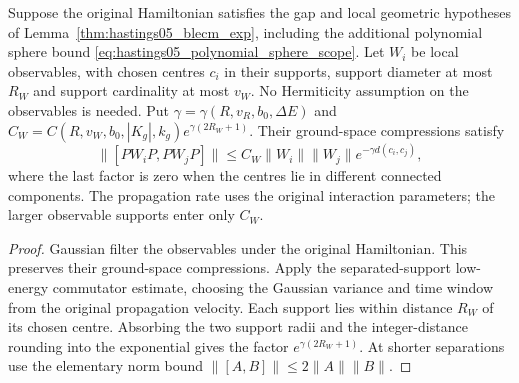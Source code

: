 \begin{lemma}
    \label{thm:hastings05_observable_commutator_decay}
    \leanok
    Suppose the original Hamiltonian satisfies the gap and local geometric
    hypotheses of Lemma~\ref{thm:hastings05_blecm_exp}, including the
    additional polynomial sphere bound
    \eqref{eq:hastings05_polynomial_sphere_scope}. Let $W_i$ be local
    observables, with chosen centres $c_i$ in their supports, support diameter
    at most $R_W$ and support cardinality at most $v_W$. No Hermiticity
    assumption on the observables is needed. Put
    $\gamma=\gamma(R,v_R,b_0,\Delta E)$ and
    $C_W=C(R,v_W,b_0,|K_g|,k_g)e^{\gamma(2R_W+1)}$.
    Their ground-space compressions satisfy
    \[
        \|[PW_iP,PW_jP]\|
        \le C_W\|W_i\|\|W_j\|e^{-\gamma d(c_i,c_j)},
    \]
    where the last factor is zero when the centres lie in different
    connected components. The propagation rate uses the original interaction
    parameters; the larger observable supports enter only $C_W$.
\end{lemma}
\begin{proof}\leanok
    Gaussian filter the observables under the original Hamiltonian. This
    preserves their ground-space compressions. Apply the separated-support
    low-energy commutator estimate, choosing the Gaussian variance and time
    window from the original propagation velocity. Each support lies within
    distance $R_W$ of its chosen centre. Absorbing the two support radii and
    the integer-distance rounding into the exponential gives the factor
    $e^{\gamma(2R_W+1)}$. At shorter separations use the elementary norm
    bound $\|[A,B]\|\le2\|A\|\|B\|$.
\end{proof}


